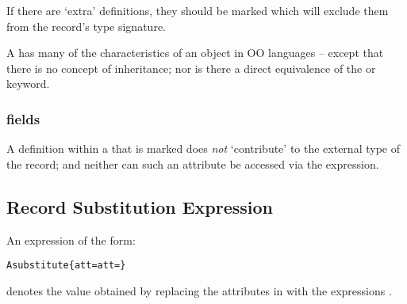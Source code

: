 \begin{aside}
If there are `extra' definitions, they should be marked  which will exclude them from the record's type signature.
\end{aside}

\begin{aside}
A  has many of the characteristics of an object in OO languages -- except that there is no concept of inheritance; nor is there a direct equivalence of the  or  keyword.
\end{aside}

%
%
%
%  

\subsubsection{ fields}
\label{privateField}
A definition within a  that is marked  does \emph{not} `contribute' to the external type of the record; and neither can such an attribute be accessed via the  expression. 

\subsection{Record Substitution Expression}
\label{recordOverride}
An expression of the form:
\begin{alltt}
A substitute \{att=\sequence{;}att\subn=\subn\}
\end{alltt}
denotes the value obtained by replacing the attributes \subi{} in  with the expressions \subi.

